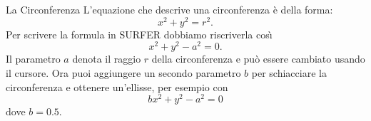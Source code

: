 \begin{surferPage}[Circonferenza]{La Circonferenza}
L'equazione che descrive una circonferenza \`e della forma: 
\[x^2+y^2=r^2.\]
Per scrivere la formula in SURFER dobbiamo riscriverla cos\`{\i}
\[x^2+y^2-a^2=0.\]
Il parametro $a$ denota il raggio $r$ della circonferenza e pu\`o essere cambiato usando il cursore. Ora puoi aggiungere un secondo parametro $b$ per schiacciare la circonferenza e ottenere un'ellisse, per esempio con
\[bx^2+y^2-a^2=0\] dove $b=0.5$.
\end{surferPage}

